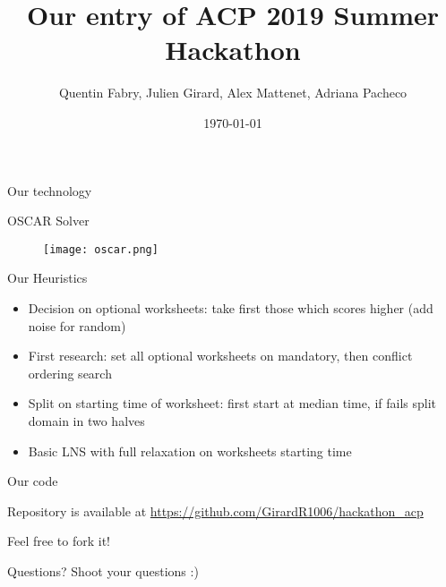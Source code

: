 \documentclass{beamer}
\title{Our entry of ACP 2019 Summer Hackathon}
\author{Quentin Fabry, Julien Girard, Alex Mattenet, Adriana Pacheco}
\date{\today}
\begin{document}
\begin{frame}
        \maketitle
\end{frame}
\begin{frame}{Our technology}
        
        OSCAR Solver

        \begin{figure}[h!]
            \centering
            \texttt{[image: oscar.png]}
        \end{figure}

\end{frame}

\begin{frame}{Our Heuristics}
    \begin{itemize}
        \item Decision on optional worksheets: take first those which scores
            higher (add noise for random)
        \item First research: set all optional worksheets on mandatory, then
            conflict ordering search
        \item Split on starting time of worksheet: first start at median time,
            if fails split domain in two halves
        \item Basic LNS with full relaxation on worksheets starting time
    \end{itemize}
\end{frame}

\begin{frame}{Our code}
\Large
\centering

    Repository is available at
    \href{https://github.com/GirardR1006/hackathon_acp}{https://github.com/GirardR1006/hackathon\_acp}


    Feel free to fork it!
    
\end{frame}

\begin{frame}{Questions?}
\centering
\Huge
Shoot your questions :) 
\end{frame}
\end{document}
